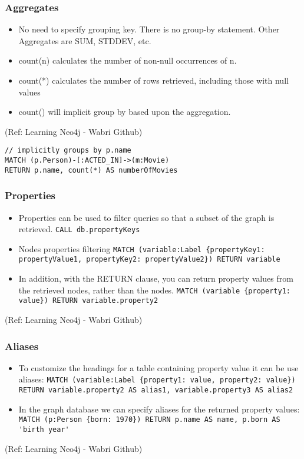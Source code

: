 \begin{frame}[fragile]\frametitle{Aggregates}

\begin{itemize}
\item No need to specify grouping key. There is no group-by statement. Other Aggregates are SUM, STDDEV, etc.
\item count(n) calculates the number of non-null occurrences of n. 
\item count(*) calculates the number of rows retrieved, including those with null values 
\item count() will implicit group by based upon the aggregation.
\end{itemize}

{\tiny (Ref: Learning Neo4j - Wabri Github)}


\begin{lstlisting}
// implicitly groups by p.name
MATCH (p.Person)-[:ACTED_IN]->(m:Movie)
RETURN p.name, count(*) AS numberOfMovies
\end{lstlisting}	

\end{frame}

\begin{frame}\frametitle{Properties }

\begin{itemize}
\item Properties can be used to filter queries so that a subset of the graph is retrieved. \lstinline|CALL db.propertyKeys|
\item Nodes properties filtering \lstinline|MATCH (variable:Label {propertyKey1: propertyValue1, propertyKey2: propertyValue2}) RETURN variable|
\item In addition, with the RETURN clause, you can return property values from the retrieved nodes, rather than the nodes. \lstinline|MATCH (variable {property1: value}) RETURN variable.property2|
\end{itemize}


{\tiny (Ref: Learning Neo4j - Wabri Github)}
\end{frame}

\begin{frame}\frametitle{Aliases }

\begin{itemize}
\item To customize the headings for a table containing property value it can be use aliases: \lstinline|MATCH (variable:Label {property1: value, property2: value}) RETURN variable.property2 AS alias1, variable.property3 AS alias2|
\item In the graph database we can specify aliases for the returned property values: \lstinline|MATCH (p:Person {born: 1970}) RETURN p.name AS name, p.born AS 'birth year'|
\end{itemize}


{\tiny (Ref: Learning Neo4j - Wabri Github)}
\end{frame}


